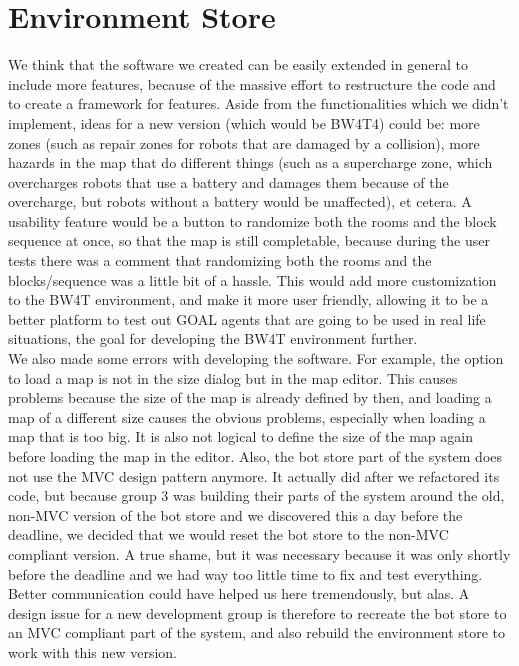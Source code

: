 \section{Environment Store}

We think that the software we created can be easily extended in general to include more features, because of the massive effort to restructure the code and to create a framework for features. Aside from the functionalities which we didn't implement, ideas for a new version (which would be BW4T4) could be: more zones (such as repair zones for robots that are damaged by a collision), more hazards in the map that do different things (such as a supercharge zone, which overcharges robots that use a battery and damages them because of the overcharge, but robots without a battery would be unaffected), et cetera. A usability feature would be a button to randomize both the rooms and the block sequence at once, so that the map is still completable, because during the user tests there was a comment that randomizing both the rooms and the blocks/sequence was a little bit of a hassle. This would add more customization to the BW4T environment, and make it more user friendly, allowing it to be a better platform to test out GOAL agents that are going to be used in real life situations, the goal for developing the BW4T environment further. \\

We also made some errors with developing the software. For example, the option to load a map is not in the size dialog but in the map editor. This causes problems because the size of the map is already defined by then, and loading a map of a different size causes the obvious problems, especially when loading a map that is too big. It is also not logical to define the size of the map again before loading the map in the editor. Also, the bot store part of the system does not use the MVC design pattern anymore. It actually did after we refactored its code, but because group 3 was building their parts of the system around the old, non-MVC version of the bot store and we discovered this a day before the deadline, we decided that we would reset the bot store to the non-MVC compliant version. A true shame, but it was necessary because it was only shortly before the deadline and we had way too little time to fix and test everything. Better communication could have helped us here tremendously, but alas. A design issue for a new development group is therefore to recreate the bot store to an MVC compliant part of the system, and also rebuild the environment store to work with this new version.

